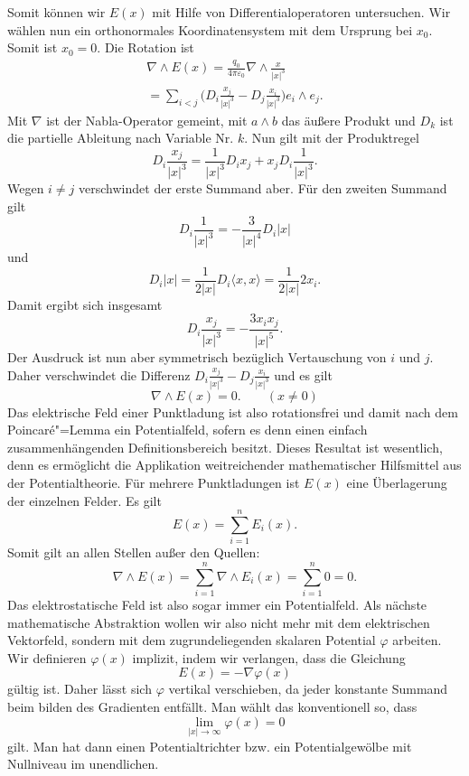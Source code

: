 \documentclass[a4paper,11pt,fleqn,twocolumn,twoside,dvipdfmx]{scrartcl}
\begin{document}
Somit können wir $E(x)$ mit Hilfe von Differentialoperatoren
untersuchen. Wir wählen nun ein orthonormales Koordinatensystem
mit dem Ursprung bei $x_0$. Somit ist $x_0=0$. Die Rotation
ist
\begin{gather*}
\nabla\wedge E(x)
= \frac{q_0}{4\pi\varepsilon_0}\nabla\wedge\frac{x}{|x|^3}\\
= \sum_{i<j} \Big(D_i\frac{x_j}{|x|^3}-D_j\frac{x_i}{|x|^3}\Big)
e_i\wedge e_j.
\end{gather*}
Mit $\nabla$ ist der Nabla-Operator gemeint, mit $a\wedge b$
das äußere Produkt und $D_k$ ist die partielle Ableitung nach
Variable Nr. $k$. Nun gilt mit der Produktregel
\[D_i \frac{x_j}{|x|^3}
= \frac{1}{|x|^3}D_i x_j+x_jD_i\frac{1}{|x|^3}.\]
Wegen $i\ne j$ verschwindet der erste Summand aber.
Für den zweiten Summand gilt
\[D_i\frac{1}{|x|^3} = -\frac{3}{|x|^4}D_i|x|\]
und
\[D_i|x| = \frac{1}{2|x|}D_i\langle x,x\rangle
= \frac{1}{2|x|} 2x_i.\]
Damit ergibt sich insgesamt
\[D_i \frac{x_j}{|x|^3}
= -\frac{3x_ix_j}{|x|^5}.\]
Der Ausdruck ist nun aber symmetrisch bezüglich Vertauschung
von $i$ und $j$. Daher verschwindet die Differenz
$D_i\frac{x_j}{|x|^3}-D_j\frac{x_i}{|x|^3}$
und es gilt
\begin{equation}
\nabla\wedge E(x)=0.\qquad (x\ne 0)
\end{equation}
Das elektrische Feld einer Punktladung ist also rotationsfrei
und damit nach dem Poincaré"=Lemma ein Potentialfeld, sofern es
denn einen einfach zusammenhängenden Definitionsbereich besitzt. Dieses
Resultat ist wesentlich, denn es ermöglicht die Applikation
weitreichender mathematischer Hilfsmittel aus der Potentialtheorie.
Für mehrere Punktladungen ist $E(x)$ eine Überlagerung der einzelnen
Felder. Es gilt
\[E(x) = \sum_{i=1}^n E_i(x).\]
Somit gilt an allen Stellen außer den Quellen:
\[\nabla\wedge E(x) = \sum_{i=1}^n \nabla\wedge E_i(x)
= \sum_{i=1}^n 0 = 0.\]
Das elektrostatische Feld ist also sogar immer ein
Potentialfeld. Als nächste mathematische Abstraktion wollen wir
also nicht mehr mit dem elektrischen Vektorfeld, sondern mit
dem zugrundeliegenden skalaren Potential $\varphi$ arbeiten.
Wir definieren $\varphi(x)$ implizit, indem wir verlangen, dass die
Gleichung
\begin{equation}\label{eq:phi-implizit}
E(x)=-\nabla\varphi(x)
\end{equation}
gültig ist. Daher lässt sich $\varphi$ vertikal verschieben, da
jeder konstante Summand beim bilden des Gradienten entfällt.
Man wählt das konventionell so, dass
\[\lim_{|x|\rightarrow\infty}\varphi(x)=0\]
gilt. Man hat dann einen Potentialtrichter bzw.
ein Potentialgewölbe mit Nullniveau im unendlichen.
\end{document}
